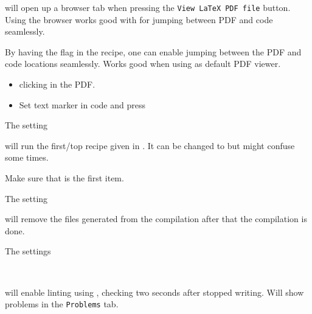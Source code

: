 will open up a browser tab when pressing the \texttt{View LaTeX PDF file} button. Using the browser works good with  for jumping between PDF and code seamlessly.


By having the flag  in the recipe, one can enable jumping between the PDF and code locations seamlessly. Works good when using  as default PDF viewer.

\begin{itemize}
    \item {} clicking in the PDF.
    \item Set text marker in code and press 
\end{itemize}


The setting


will run the first/top recipe given in . It can be changed to  but might confuse some times.

Make sure that  is the first item.



The setting


will remove the  files generated from the compilation after that the compilation is done.



The settings

\\

will enable linting using , checking two seconds after stopped writing. Will show problems in the \texttt{Problems} tab.

